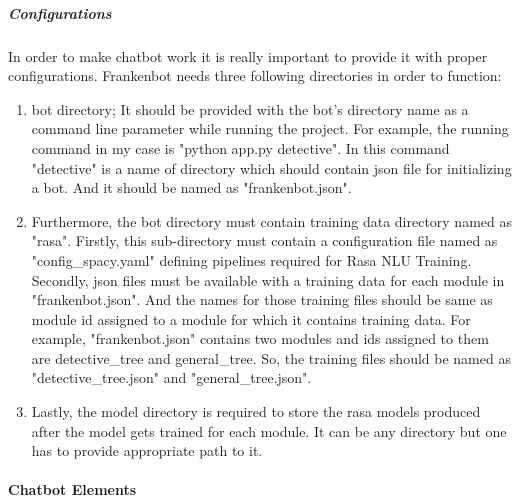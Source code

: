 \subparagraph*{Configurations \label{par:config}}
In order to make chatbot work it is really important to provide it with proper configurations. Frankenbot needs three following directories in order to function:
\begin{enumerate}
    \item bot directory; It should be provided with the bot's directory name as a command line parameter while running the project. For example, the running command in my case is "python app.py detective". In this command "detective" is a name of directory which should contain json file for initializing a bot. And it should be named as "frankenbot.json". 
    \item Furthermore, the bot directory must contain training data directory named as "rasa". Firstly, this sub-directory must contain a configuration file named as "config\_spacy.yaml" defining pipelines required for Rasa NLU Training\cite{rasapipeline}. Secondly, json files must be available with a training data for each module in "frankenbot.json". And the names for those training files should be same as module id assigned to a module for which it contains training data. For example, "frankenbot.json" contains two modules and ids assigned to them are detective\_tree and general\_tree. So, the training files should be named as "detective\_tree.json" and "general\_tree.json".
    \item Lastly, the model directory is required to store the rasa models produced after the model gets trained for each module. It can be any directory but one has to provide appropriate path to it.
\end{enumerate} 

\paragraph*{Chatbot Elements}

